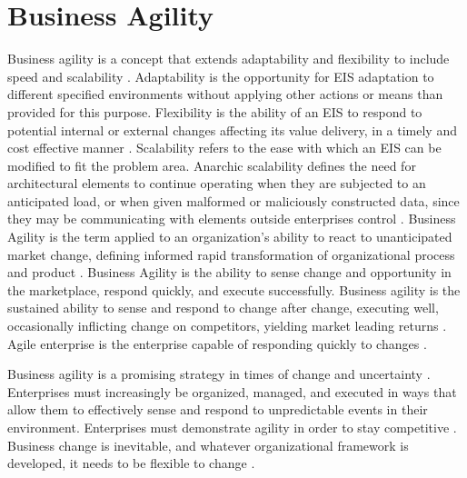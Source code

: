 \documentclass[12pt,a4paper,final,twoside,onecolumn,titlepage]{book}
\begin{document}
\section{Business Agility}
Business agility is a concept that extends adaptability and flexibility to include speed and scalability \citep{W28}. Adaptability is the opportunity for \gls{EIS} adaptation to different specified environments without applying other actions or means than provided for this purpose.  Flexibility is the ability of an \gls{EIS} to respond to potential internal or external changes affecting its value delivery, in a timely and cost effective manner \citep{M38}. Scalability refers to the ease with which an \gls{EIS} can be modified to fit the problem area. Anarchic scalability defines the need for architectural elements to continue operating when they are subjected to an anticipated load, or when given malformed or maliciously constructed data, since they may be communicating with elements outside enterprises control \citep{EV05}. Business Agility is the term applied to an organization's ability to react to unanticipated market change, defining informed rapid transformation of organizational process and product \citep{BS10}. Business Agility is the ability to sense change and opportunity in the marketplace, respond quickly, and execute successfully. Business agility is the sustained ability to sense and respond to change after change, executing well, occasionally inflicting change on competitors, yielding market leading returns \citep{BS11}. Agile enterprise is the enterprise capable of responding quickly to changes \citep{BS12}.

Business agility is a promising strategy in times of change and uncertainty \citep{W28}. Enterprises must increasingly be organized, managed, and executed in ways that allow them to effectively sense and respond to unpredictable events in their environment. Enterprises must demonstrate agility in order to stay competitive \citep{BS13}. Business change is inevitable, and whatever organizational framework is developed, it needs to be flexible to change \citep{W27, BS15}.
\end{document}
